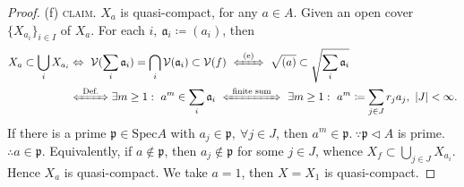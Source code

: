 \documentclass[12pt,a4paper,footinclude=true,headinclude=true]{scrbook} %
\begin{document}
\begin{proof}
    (f) \textsc{claim.} $X_a$ is quasi-compact, for any $a\in A$. Given an open cover $\{X_{a_i}\}_{i\in I}$ of $X_a$. For each $i,\ \mathfrak{a}_i\coloneqq(a_i)$, then 
    \begin{align*}
        X_a\subset\bigcup_iX_{a_i} &\Leftrightarrow\  \mathcal{V}(\sum_i\mathfrak{a}_i)=\bigcap_i\mathcal{V}(\mathfrak{a}_i)\subset\mathcal{V}(f)\ \xLeftrightarrow{~\text{(e)}~}\ \sqrt{(a)}\subset\sqrt{\sum_i\mathfrak{a}_i}\\
        &\xLeftrightarrow{~\text{Def.}~} \exists m\geq1:\ a^m\in\sum_i\mathfrak{a}_i\ \xLeftrightarrow{~\text{finite sum}~}\ \exists m\geq1:\ a^m\coloneqq\sum_{j\in J}r_ja_j,\ |J|<\infty.
    \end{align*}
    If there is a prime $\mathfrak{p}\in\mathrm{Spec}A$ with $a_j\in\mathfrak{p},\ \forall j\in J$, then $a^m\in\mathfrak{p}.\ \because \mathfrak{p}\triangleleft A$ is prime. $\therefore a\in\mathfrak{p}$. Equivalently, if $a\notin\mathfrak{p}$, then $a_j\notin\mathfrak{p}$ for some $j\in J$, whence $X_f\subset\bigcup_{j\in J}X_{a_i}$. Hence $X_a$ is quasi-compact. We take $a=1$, then $X=X_1$ is quasi-compact.
\end{proof}
\end{document}
